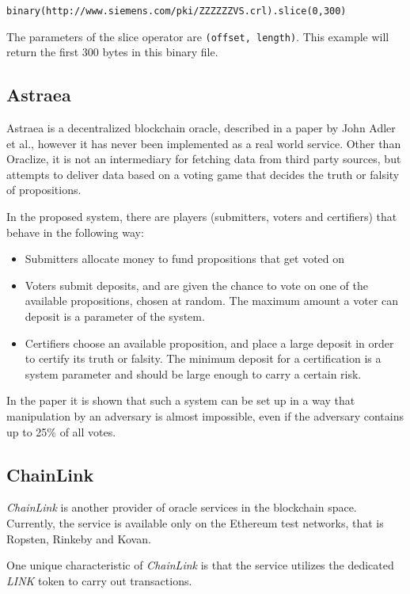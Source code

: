 \texttt{binary(http://www.siemens.com/pki/ZZZZZZVS.crl).slice(0,300)}

The parameters of the slice operator are \texttt{(offset, length)}. This example will return the first 300 bytes in this binary file.
\subsection{Astraea}
Astraea is a decentralized blockchain oracle, described in a paper by John Adler et al.\cite{astraea}, however it has never been implemented as a real world service. Other than Oraclize, it is not an intermediary for fetching data from third party sources, but attempts to deliver data based on a voting game that decides the truth or falsity of propositions.

In the proposed system, there are players (submitters, voters and certifiers) that behave in the following way:
\begin{itemize}
	\item Submitters allocate money to fund propositions that get voted on
	\item Voters submit deposits, and are given the chance to vote on one of the available propositions, chosen at random. The maximum amount a voter can deposit is a parameter of the system.
	\item Certifiers choose an available proposition, and place a large deposit in order to certify its truth or falsity. The minimum deposit for a certification is a system parameter and should be large enough to carry a certain risk.
\end{itemize}
In the paper it is shown that such a system can be set up in a way that manipulation by an adversary is almost impossible, even if the adversary contains up to 25\% of all votes\cite{astraea}.

\subsection{ChainLink}
\emph{ChainLink} is another provider of oracle services in the blockchain space. Currently, the service is available only on the Ethereum test networks, that is Ropsten, Rinkeby and Kovan.

One unique characteristic of \emph{ChainLink} is that the service utilizes the dedicated \emph{LINK} token to carry out transactions. 
